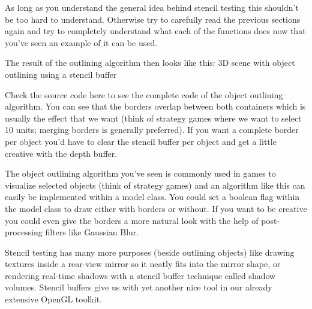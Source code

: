 \documentclass{article}
\begin{document}
As long as you understand the general idea behind stencil testing this shouldn't be too hard to understand. Otherwise try to carefully read the previous sections again and try to completely understand what each of the functions does now that you've seen an example of it can be used.

The result of the outlining algorithm then looks like this:
3D scene with object outlining using a stencil buffer

Check the source code here to see the complete code of the object outlining algorithm.
You can see that the borders overlap between both containers which is usually the effect that we want (think of strategy games where we want to select 10 units; merging borders is generally preferred). If you want a complete border per object you'd have to clear the stencil buffer per object and get a little creative with the depth buffer.

The object outlining algorithm you've seen is commonly used in games to visualize selected objects (think of strategy games) and an algorithm like this can easily be implemented within a model class. You could set a boolean flag within the model class to draw either with borders or without. If you want to be creative you could even give the borders a more natural look with the help of post-processing filters like Gaussian Blur.

Stencil testing has many more purposes (beside outlining objects) like drawing textures inside a rear-view mirror so it neatly fits into the mirror shape, or rendering real-time shadows with a stencil buffer technique called shadow volumes. Stencil buffers give us with yet another nice tool in our already extensive OpenGL toolkit.
\end{document}
